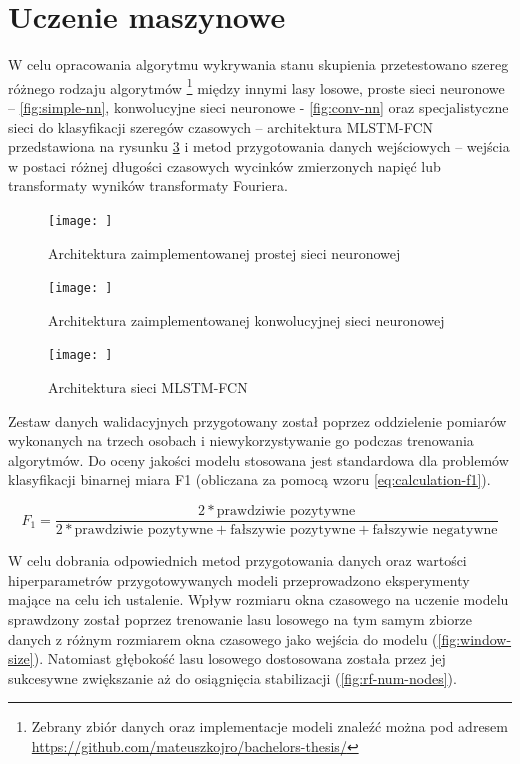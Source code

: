\documentclass{./assets/wfis}
\begin{document}
\section{Uczenie maszynowe}\label{uczenie-maszynowe}
W celu opracowania algorytmu wykrywania stanu skupienia przetestowano szereg różnego rodzaju algorytmów \footnote{Zebrany zbiór danych oraz implementacje modeli znaleźć można pod adresem \url{https://github.com/mateuszkojro/bachelors-thesis/}} między innymi lasy losowe, proste sieci neuronowe – \autoref{fig:simple-nn}, konwolucyjne sieci neuronowe - \autoref{fig:conv-nn} oraz specjalistyczne sieci do klasyfikacji szeregów czasowych – architektura MLSTM-FCN \cite{karim_multivariate_2019} przedstawiona na rysunku \ref{fig:mlstm} i metod przygotowania danych wejściowych – wejścia w postaci różnej długości czasowych wycinków zmierzonych napięć lub transformaty wyników transformaty Fouriera.

\begin{figure}[h!]
    \centering
    \texttt{[image: ]}
    \caption{Architektura zaimplementowanej prostej sieci neuronowej}
    \label{fig:simple-nn}
\end{figure}

\begin{figure}[h!]
    \centering
    \texttt{[image: ]}
    \caption{Architektura zaimplementowanej konwolucyjnej sieci neuronowej}
    \label{fig:conv-nn}
\end{figure}

\begin{figure}[h!]
    \centering
    \texttt{[image: ]}
    \caption{Architektura sieci MLSTM-FCN}
    \label{fig:mlstm}
\end{figure}


Zestaw danych walidacyjnych przygotowany został poprzez oddzielenie pomiarów wykonanych na trzech osobach i niewykorzystywanie go podczas trenowania algorytmów. Do oceny jakości modelu stosowana jest standardowa dla problemów klasyfikacji binarnej miara F1 (obliczana za pomocą wzoru \ref{eq:calculation-f1}).

\begin{equation}\label{eq:calculation-f1}
    F_1 = \frac{2*\text{prawdziwie pozytywne}}{2*\text{prawdziwie pozytywne}+\text{fałszywie pozytywne}+\text{fałszywie negatywne}}
\end{equation}


W celu dobrania odpowiednich metod przygotowania danych oraz wartości hiperparametrów przygotowywanych modeli przeprowadzono eksperymenty mające na celu ich ustalenie. Wpływ rozmiaru okna czasowego na uczenie modelu sprawdzony został poprzez trenowanie lasu losowego na tym samym zbiorze danych z różnym rozmiarem okna czasowego jako wejścia do modelu (\autoref{fig:window-size}). Natomiast głębokość lasu losowego dostosowana została przez jej sukcesywne zwiększanie aż do osiągnięcia stabilizacji (\autoref{fig:rf-num-nodes}).
\end{document}
